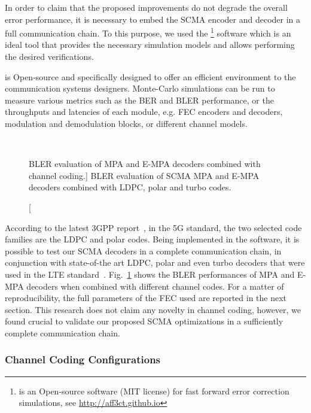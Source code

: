 In order to claim that the proposed improvements do not degrade the overall
error performance, it is necessary to embed the SCMA encoder and decoder in a
full communication chain. To this purpose, we used the \AFFECT\footnote{\AFFECT
is an Open-source software (MIT license) for fast forward error correction
simulations, see \url{http://aff3ct.github.io}} software which is an ideal
tool that provides the necessary simulation models and allows performing the
desired verifications.

\AFFECT is Open-source and specifically designed to offer an efficient
environment to the communication systems designers. Monte-Carlo simulations can
be run to measure various metrics such as the BER and BLER performance, or the
throughputs and latencies of each module, e.g. FEC encoders and decoders,
modulation and demodulation blocks, or different channel models.

\begin{figure}[htp]
  \centering
  \\
  \centering
  \caption
    [BLER evaluation of MPA and E-MPA decoders combined with channel coding.]
    {BLER evaluation of SCMA MPA and E-MPA decoders combined with LDPC, polar
    and turbo codes.}
  \label{plot:scma_fec}
\end{figure}

According to the latest 3GPP report~\cite{ETSI2018}, in the 5G standard, the
two selected code families are the LDPC and polar codes. Being implemented in
the \AFFECT software, it is possible to test our SCMA decoders in a complete
communication chain, in conjunction with state-of-the art LDPC, polar and even
turbo decoders that were used in the LTE standard~\cite{ETSI2013}.
Fig.~\ref{plot:scma_fec} shows the BLER performances of MPA and E-MPA decoders
when combined with different channel codes. For a matter of reproducibility, the
full parameters of the FEC used are reported in the next section. This research
does not claim any novelty in channel coding, however, we found crucial to
validate our proposed SCMA optimizations in a sufficiently complete
communication chain.

\subsubsection{Channel Coding Configurations}
\label{sec:scma_fec_characteristics}

